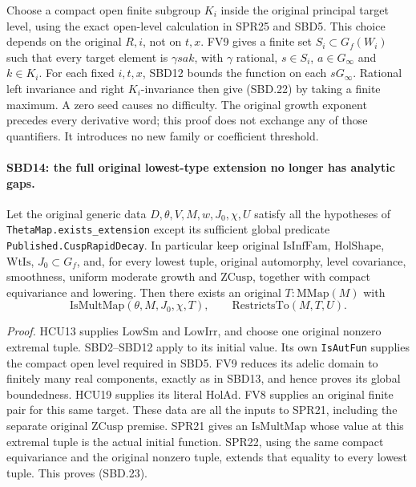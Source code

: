 Choose a compact open finite subgroup \(K_i\) inside the
original principal target level, using the exact open-level
calculation in SPR25 and SBD5.  This choice depends on the
original \(R,i\), not on \(t,x\).  FV9 gives a finite set
\(S_i\subset G_f(W_i)\) such that every target element is
\(\gamma s a k\), with \(\gamma\) rational,
\(s\in S_i\), \(a\in G_\infty\) and \(k\in K_i\).
For each fixed \(i,t,x\), SBD12 bounds the function on each
\(sG_\infty\).  Rational left invariance and right
\(K_i\)-invariance then give (SBD.22) by taking a finite
maximum.  A zero seed causes no difficulty.  The original
growth exponent precedes every derivative word; this proof
does not exchange any of those quantifiers.  It introduces
no new family or coefficient threshold.

\paragraph{SBD14: the full original lowest-type extension no longer has analytic gaps.}
\label{claim:SBD14}
Let the original generic data \(D,\theta,V,M,w,J_0,\chi,U\)
satisfy all the hypotheses of
\texttt{Theta\allowbreak Map.\allowbreak exists\_\allowbreak extension} except its sufficient
global predicate \texttt{Published.\allowbreak Cusp\allowbreak Rapid\allowbreak Decay}.
In particular keep original \(\mathrm{IsInfFam}\),
\(\mathrm{HolShape}\), \(\mathrm{WtIs}\),
\(J_0\subset G_f\), and, for every lowest tuple, original
automorphy, level covariance, smoothness, uniform moderate
growth and \(\mathrm{ZCusp}\), together with compact
equivariance and lowering.  Then there exists an original
\(T:\mathrm{MMap}(M)\) with
\[
       \mathrm{IsMultMap}(\theta,M,J_0,\chi,T),\qquad
       \mathrm{RestrictsTo}(M,T,U).
 \tag{SBD.23}
\]

\emph{Proof.}
HCU13 supplies \(\mathrm{LowSm}\) and \(\mathrm{LowIrr}\),
and choose one original nonzero extremal tuple.  SBD2--SBD12
apply to its initial value.  Its own \texttt{Is\allowbreak Aut\allowbreak Fun} supplies
the compact open level required in SBD5.  FV9 reduces its
adelic domain to finitely many real components, exactly as
in SBD13, and hence proves its global boundedness.
HCU19 supplies its literal \(\mathrm{HolAd}\).  FV8 supplies
an original finite pair for this same target.  These data are
all the inputs to SPR21, including the separate original
\(\mathrm{ZCusp}\) premise.  SPR21 gives an \(\mathrm{IsMultMap}\)
whose value at this extremal tuple is the actual initial
function.  SPR22, using the same compact equivariance and
the original nonzero tuple, extends that equality to every
lowest tuple.  This proves (SBD.23).

